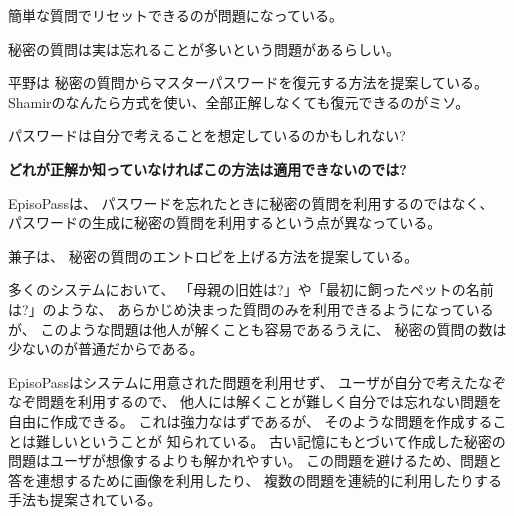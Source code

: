 \documentclass[twoside]{wiss}
\begin{document}
簡単な質問でリセットできるのが問題になっている。

秘密の質問は実は忘れることが多いという問題があるらしい。

平野\cite{平野亮:2011-11-07}は
秘密の質問からマスターパスワードを復元する方法を提案している。
Shamirのなんたら方式を使い、全部正解しなくても復元できるのがミソ。

パスワードは自分で考えることを想定しているのかもしれない?

\textbf{どれが正解か知っていなければこの方法は適用できないのでは?}


EpisoPassは、
パスワードを忘れたときに秘密の質問を利用するのではなく、
パスワードの生成に秘密の質問を利用するという点が異なっている。

兼子は、
秘密の質問のエントロピを上げる方法を提案している\cite{Kaneko}。

多くのシステムにおいて、
「母親の旧姓は?」や「最初に飼ったペットの名前は?」のような、
あらかじめ決まった質問のみを利用できるようになっているが、
このような問題は他人が解くことも容易であるうえに、
秘密の質問の数は少ないのが普通だからである\cite{Rabkin:2008:PKQ:1408664.1408667}。

EpisoPassはシステムに用意された問題を利用せず、
ユーザが自分で考えたなぞなぞ問題を利用するので、
他人には解くことが難しく自分では忘れない問題を自由に作成できる。
これは強力なはずであるが、
そのような問題を作成することは難しいということが
知られている\cite{Just:2009:PCC:1572532.1572543}\cite{Schechter:2009:NSM:1607723.1608145}。
%
%
%
古い記憶にもとづいて作成した秘密の問題はユーザが想像するよりも解かれやすい。
この問題を避けるため、問題と答を連想するために画像を利用したり、
複数の問題を連続的に利用したりする手法も提案されている\cite{Renaud:2010:PQE:2146303.2146318}。




\end{document}
